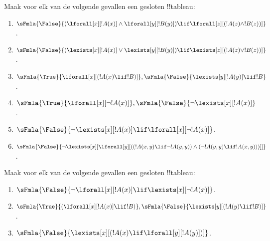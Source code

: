 \documentclass[openany]{memoir}
\begin{document}
\begin{prob}
Maak voor elk van de volgende gevallen een gesloten !!{tableau}:
\begin{enumerate}
\item $\sFmla{\False}{(\lforall[x][!A(x)] \land \lforall[y][!B(y)])
\lif \lforall[z][(!A(z) \land !B(z))]}$.
\item $\sFmla{\False}{(\lexists[x][!A(x)] \lor \lexists[y][!B(y)])
\lif \lexists[z][(!A(z) \lor !B(z))]}$.
\item $\sFmla{\True}{\lforall[x][(!A(x) \lif !B)]},
\sFmla{\False}{\lexists[y][!A(y)] \lif !B}$.
\item $\sFmla{\True}{\lforall[x][\lnot !A(x)]},
\sFmla{\False}{\lnot\lexists[x][!A(x)]}$.
\item $\sFmla{\False}{\lnot\lexists[x][!A(x)] \lif \lforall[x][\lnot
!A(x)]}$.
\item $\sFmla{\False}{\lnot\lexists[x][\lforall[y][((!A(x,y) \lif
\lnot !A(y,y)) \land (\lnot !A(y,y) \lif !A(x,y)))]]}$.
\end{enumerate}
\end{prob}

\begin{prob}
Maak voor elk van de volgende gevallen een gesloten !!{tableau}:
\begin{enumerate}
\item $\sFmla{\False}{\lnot\lforall[x][!A(x)] \lif \lexists[x][\lnot!A(x)]}$.
\item $\sFmla{\True}{(\lforall[x][!A(x)] \lif !B)}, \sFmla{\False}{\lexists[y][(!A(y) \lif !B)]}$.
\item $\sFmla{\False}{\lexists[x][(!A(x) \lif \lforall[y][!A(y)])]}$.
\end{enumerate}
\end{prob}
\endgroup

\begingroup
\def\olfilename{OLP-0105}
\def\olfilepath{content/first-order-logic/tableaux/}
\hypertarget{unit-OLP-0105}{}



      {}
      {}
      
\end{document}
